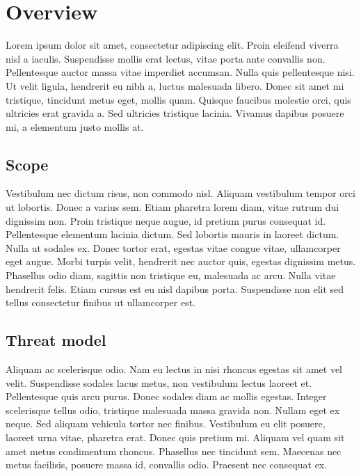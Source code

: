 \chapter{Overview}
Lorem ipsum dolor sit amet, consectetur adipiscing elit. Proin eleifend viverra nisl a iaculis. Suspendisse mollis erat lectus, vitae porta ante convallis non. Pellentesque auctor massa vitae imperdiet accumsan. Nulla quis pellentesque nisi. Ut velit ligula, hendrerit eu nibh a, luctus malesuada libero. Donec sit amet mi tristique, tincidunt metus eget, mollis quam. Quisque faucibus molestie orci, quis ultricies erat gravida a. Sed ultricies tristique lacinia. Vivamus dapibus posuere mi, a elementum justo mollis at.

\section{Scope}
Vestibulum nec dictum risus, non commodo nisl. Aliquam vestibulum tempor orci ut lobortis. Donec a varius sem. Etiam pharetra lorem diam, vitae rutrum dui dignissim non. Proin tristique neque augue, id pretium purus consequat id. Pellentesque elementum lacinia dictum. Sed lobortis mauris in laoreet dictum. Nulla ut sodales ex. Donec tortor erat, egestas vitae congue vitae, ullamcorper eget augue. Morbi turpis velit, hendrerit nec auctor quis, egestas dignissim metus. Phasellus odio diam, sagittis non tristique eu, malesuada ac arcu. Nulla vitae hendrerit felis. Etiam cursus est eu nisl dapibus porta. Suspendisse non elit sed tellus consectetur finibus ut ullamcorper est.

\section{Threat model}

Aliquam ac scelerisque odio. Nam eu lectus in nisi rhoncus egestas sit amet vel velit. Suspendisse sodales lacus metus, non vestibulum lectus laoreet et. Pellentesque quis arcu purus. Donec sodales diam ac mollis egestas. Integer scelerisque tellus odio, tristique malesuada massa gravida non. Nullam eget ex neque. Sed aliquam vehicula tortor nec finibus. Vestibulum eu elit posuere, laoreet urna vitae, pharetra erat. Donec quis pretium mi. Aliquam vel quam sit amet metus condimentum rhoncus. Phasellus nec tincidunt sem. Maecenas nec metus facilisis, posuere massa id, convallis odio. Praesent nec consequat ex.


